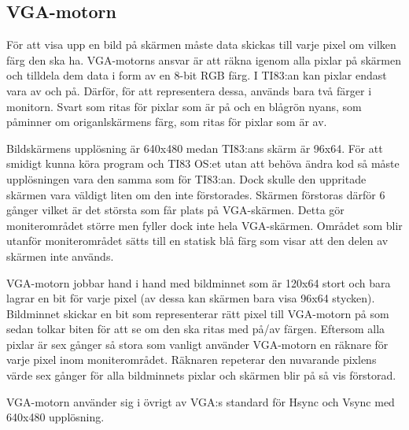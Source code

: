 \documentclass[main.tex]{subfiles}
\begin{document}
\subsection{VGA-motorn}

För att visa upp en bild på skärmen måste data skickas till varje pixel om
vilken färg den ska ha. VGA-motorns ansvar är att räkna igenom alla pixlar på
skärmen och tilldela dem data i form av en 8-bit RGB färg. I TI83:an kan pixlar
endast vara av och på. Därför, för att representera dessa, används bara två
färger i monitorn. Svart som ritas för pixlar som är på och en blågrön nyans,
som påminner om origanlskärmens färg, som ritas för pixlar som är av.

Bildskärmens upplösning är 640x480 medan TI83:ans skärm är 96x64. För att
smidigt kunna köra program och TI83 OS:et utan att behöva ändra kod så måste
upplösningen vara den samma som för TI83:an. Dock skulle den uppritade skärmen
vara väldigt liten om den inte förstorades. Skärmen förstoras därför 6 gånger
vilket är det största som får plats på VGA-skärmen. Detta gör moniterområdet
större men fyller dock inte hela VGA-skärmen. Området som blir utanför
moniterområdet sätts till en statisk blå färg som visar att den delen av
skärmen inte används. 

VGA-motorn jobbar hand i hand med bildminnet som är 120x64 stort och bara
lagrar en bit för varje pixel (av dessa kan skärmen bara visa 96x64 stycken).
Bildminnet skickar en bit som representerar rätt pixel till VGA-motorn på som
sedan tolkar biten för att se om den ska ritas med på/av färgen. Eftersom alla
pixlar är sex gånger så stora som vanligt använder VGA-motorn en räknare för
varje pixel inom moniterområdet. Räknaren repeterar den nuvarande pixlens värde
sex gånger för alla bildminnets pixlar och skärmen blir på så vis förstorad.
 
VGA-motorn använder sig i övrigt av VGA:s standard för Hsync och Vsync med
640x480 upplösning. \cite{vgastd} 
\end{document}
